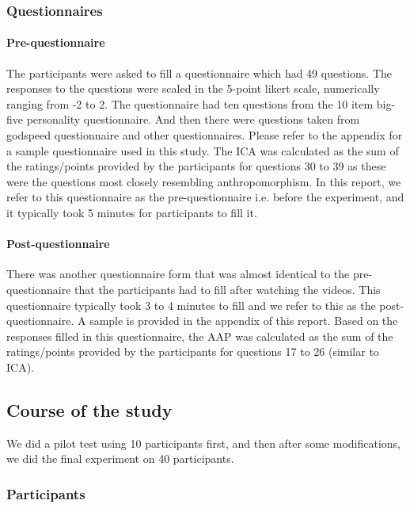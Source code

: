 \documentclass{acm_proc_article-sp}
\begin{document}
\subsubsection{Questionnaires}

\paragraph{Pre-questionnaire}

The participants were asked to fill a questionnaire which had 49 questions. The
responses to the questions were scaled in the 5-point likert scale, numerically
ranging from -2 to 2. The questionnaire had ten questions from the 10 item
big-five personality questionnaire. And then there were questions taken from
godspeed questionnaire and other questionnaires. Please refer to the appendix
for a sample questionnaire used in this study. The ICA was calculated as the sum
of the ratings/points provided by the participants for questions 30 to 39 as
these were the questions most closely resembling anthropomorphism. In this
report, we refer to this questionnaire as the pre-questionnaire i.e. before the
experiment, and it typically took 5 minutes for participants to fill it. 

\paragraph{Post-questionnaire}

There was another questionnaire form that was almost identical to the
pre-questionnaire that the participants had to fill after watching the videos.
This questionnaire typically took 3 to 4 minutes to fill and we refer to this as
the post-questionnaire. A sample is provided in the appendix of this report.
Based on the responses filled in this questionnaire, the AAP was calculated as
the sum of the ratings/points provided by the participants for questions 17 to
26 (similar to ICA).


\subsection{Course of the study}

We did a pilot test using 10 participants first, and then after some
modifications, we did the final experiment on 40 participants.

\subsubsection{Participants}
\end{document}
